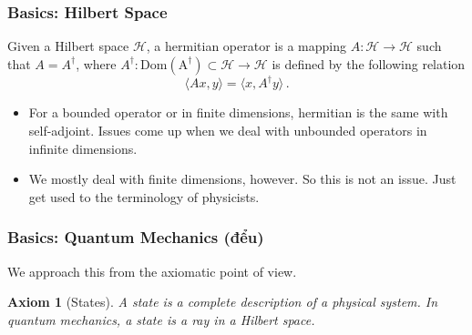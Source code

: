 \documentclass[12pt]{beamer}
\newtheorem{axiom}{Axiom}
\begin{document}
\begin{frame}
    \frametitle{ Basics: Hilbert Space}
    \begin{definition}
        Given a Hilbert space $\mathcal{H}$,
        a hermitian operator is a mapping $A:\mathcal{H} \to \mathcal{H}$ such that
        $A = A^\dag$, where $A^\dag: \mathrm{Dom(A^\dag)}\subset \mathcal{H} \to \mathcal{H}$ is defined by the following relation
        \begin{equation*}
            \langle A x , y \rangle = \langle x , A^\dag y \rangle \,.
        \end{equation*}
    \end{definition}
    \begin{itemize}
        \item For a bounded operator or in finite dimensions, hermitian is the same with self-adjoint.
    Issues come up when we deal with unbounded operators in  infinite dimensions.
        \item We mostly deal with finite dimensions, however. So this is not an issue. Just get used
    to the terminology of physicists.
    \end{itemize}

\end{frame}

\begin{frame}
\frametitle{Basics: Quantum Mechanics \pause (đểu)}
We approach this from the axiomatic point of view. 

\begin{axiom}[States]
    A state is a complete description of a physical system. 
    In quantum mechanics, a state is a ray in a Hilbert space.
\end{axiom}

\end{frame}



\printbibliography 
%
%
\end{document}
